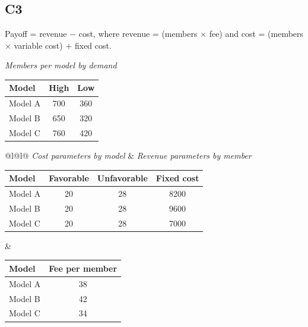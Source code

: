 \begin{ExamProblems}
		\subsection*{C3}
		Payoff = revenue $-$ cost, where revenue = (members $\times$ fee) and cost = (members $\times$ variable cost) $+$ fixed cost.
		\begin{center}
			\textit{Members per model by demand} \\
			\begin{tabular}{l c c}
				\toprule
				Model & High & Low \\
				\midrule
				Model A & 700 & 360 \\
				Model B & 650 & 320 \\
				Model C & 760 & 420 \\
				\bottomrule
		\end{tabular}
		\end{center}
		\begin{center}
			\begin{tabular}{@{}l@{\hspace{0.06\linewidth}}l@{}}
				\textit{Cost parameters by model} & \textit{Revenue parameters by member} \\
				\begin{tabular}{l c c c}
					\toprule
					Model & Favorable & Unfavorable & Fixed cost \\
					\midrule
					Model A & 20 & 28 & 8200 \\
					Model B & 20 & 28 & 9600 \\
					Model C & 20 & 28 & 7000 \\
					\bottomrule
				\end{tabular}
				&
				\begin{tabular}{l c}
					\toprule
					Model & Fee per member \\
					\midrule
					Model A & 38 \\
					Model B & 42 \\
					Model C & 34 \\
					\bottomrule
				\end{tabular}
			\end{tabular}
		\end{center}


\end{ExamProblems}
